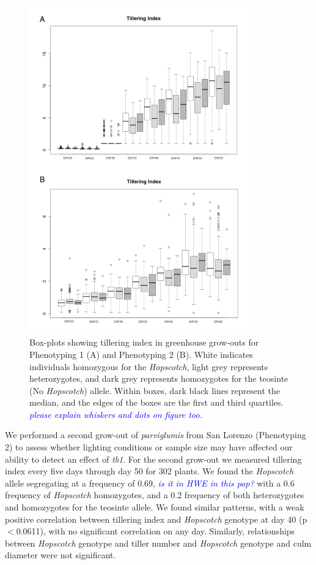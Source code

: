 \documentclass[11pt]{article}
\newcommand{\jri}[1]{\textcolor{blue}{ \emph{\scriptsize  #1}} }
\begin{document}
\begin{linenumbers}
\begin{flushleft}
\begin{figure}[!t]
  \begin{center}
   \includegraphics[width=95mm]{Fig4Boxplots.pdf}
    \caption{Box-plots showing tillering index in greenhouse grow-outs for Phenotyping 1 (A) and Phenotyping 2 (B). White indicates individuals homozygous for the \emph{Hopscotch}, light grey represents heterozygotes, and dark grey represents homozygotes for the teosinte (No \emph{Hopscotch}) allele. Within boxes, dark black lines represent the median, and the edges of the boxes are the first and third quartiles. \jri{please explain whiskers and dots on figure too.}} 
\label{Fig4Boxplots}
  \end{center}
\end{figure}

We performed a second grow-out  of \emph{parviglumis} from San Lorenzo (Phenotyping 2) to assess whether lighting conditions or sample size may have affected our ability to detect an effect of \emph{tb1}.  For the second grow-out we measured tillering index every five days through day 50 for 302 plants. We found the \emph{Hopscotch} allele segregating at a frequency of 0.69, \jri{is it in HWE in this pop?} with a 0.6 frequency of \emph{Hopscotch} homozygotes, and a 0.2 frequency of both heterozygotes and homozygotes for the teosinte allele. We found similar patterns, with a weak positive correlation between tillering index and \emph{Hopscotch} genotype at day 40 (p$<$0.0611), with no significant correlation on any day. Similarly, relationships between \emph{Hopscotch} genotype and tiller number and \emph{Hopscotch} genotype and culm diameter were not significant. 


\end{flushleft}
\end{linenumbers}
\end{document}

